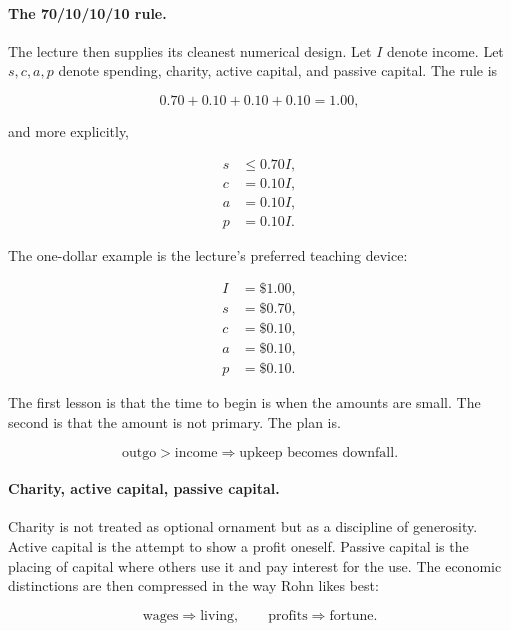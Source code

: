 \paragraph{The 70/10/10/10 rule.}
The lecture then supplies its cleanest numerical design. Let \(I\) denote income. Let \(s,c,a,p\) denote spending, charity, active capital, and passive capital. The rule is

\begin{equation}
0.70+0.10+0.10+0.10=1.00,
\end{equation}

and more explicitly,

\begin{align}
s &\leq 0.70I, \\
c &= 0.10I, \\
a &= 0.10I, \\
p &= 0.10I.
\end{align}

The one-dollar example is the lecture's preferred teaching device:

\begin{align}
I &= \$1.00, \\
s &= \$0.70, \\
c &= \$0.10, \\
a &= \$0.10, \\
p &= \$0.10.
\end{align}

The first lesson is that the time to begin is when the amounts are small. The second is that the amount is not primary. The plan is.

\begin{equation}
\text{outgo}>\text{income}\Rightarrow \text{upkeep becomes downfall}.
\end{equation}

\paragraph{Charity, active capital, passive capital.}
Charity is not treated as optional ornament but as a discipline of generosity. Active capital is the attempt to show a profit oneself. Passive capital is the placing of capital where others use it and pay interest for the use. The economic distinctions are then compressed in the way Rohn likes best:

\begin{equation}
\text{wages}\Rightarrow \text{living}, \qquad \text{profits}\Rightarrow \text{fortune}.
\end{equation}

